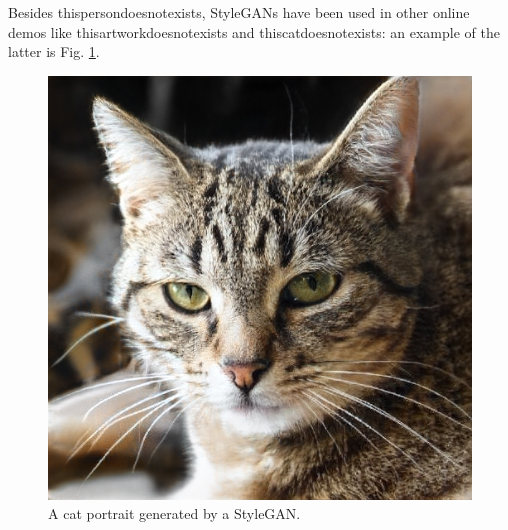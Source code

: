 \documentclass[conference]{IEEEtran}
\begin{document}
Besides thispersondoesnotexists, StyleGANs have been used in other online demos like thisartworkdoesnotexists and thiscatdoesnotexists: an example of the latter is Fig. \ref{styleganimage}.
\begin{figure}[htbp]
\centerline{\includegraphics[scale=.33]{img/stylegan.jpg}}
\caption{A cat portrait generated by a StyleGAN.}
\label{styleganimage}
\end{figure}
\end{document}
